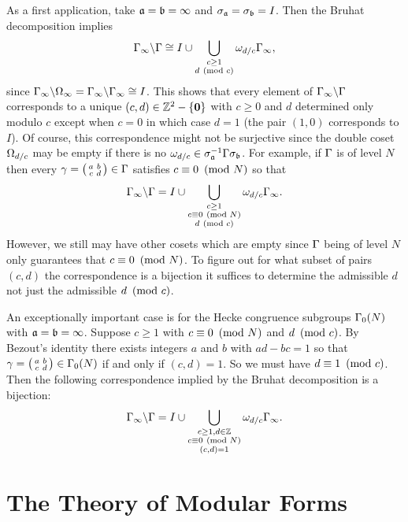       As a first application, take $\mathfrak{a} = \mathfrak{b} = \infty$ and $\sigma_{\mathfrak{a}} = \sigma_{\mathfrak{b}} = I$. Then the Bruhat decomposition implies
      \[
        \Gamma_{\infty}\backslash\Gamma \cong I\cup\bigcup_{\substack{c \ge 1 \\ d \ \left(\text{mod }c\right)}}\omega_{d/c}\Gamma_{\infty},
      \]
      since $\Gamma_{\infty}\backslash\Omega_{\infty} = \Gamma_{\infty}\backslash\Gamma_{\infty} \cong I$. This shows that every element of $\Gamma_{\infty}\backslash\Gamma$ corresponds to a unique $(c,d) \in \mathbb{Z}^{2}-\{\mathbf{0}\}$ with $c \ge 0$ and $d$ determined only modulo $c$ except when $c = 0$ in which case $d = 1$ (the pair $(1,0)$ corresponds to $I$). Of course, this correspondence might not be surjective since the double coset $\Omega_{d/c}$ may be empty if there is no $\omega_{d/c} \in \sigma_{\mathfrak{a}}^{-1}\Gamma\sigma_{\mathfrak{b}}$. For example, if $\Gamma$ is of level $N$ then every $\gamma = \begin{psmallmatrix} a & b \\ c & d \end{psmallmatrix} \in \Gamma$ satisfies $c \equiv 0 \ \left(\text{mod }N\right)$ so that
      \[
        \Gamma_{\infty}\backslash\Gamma = I\cup\bigcup_{\substack{c \ge 1 \\ c \equiv 0 \ \left(\text{mod }N\right) \\ d \ \left(\text{mod }c\right)}}\omega_{d/c}\Gamma_{\infty}.
      \]
      However, we still may have other cosets which are empty since $\Gamma$ being of level $N$ only guarantees that $c \equiv 0 \ \left(\text{mod }N\right)$. To figure out for what subset of pairs $(c,d)$ the correspondence is a bijection it suffices to determine the admissible $d$ not just the admissible $d \ \left(\text{mod }c\right)$. 
      
      \begin{remark}\label{rem:Bruhat_bijection}
        An exceptionally important case is for the Hecke congruence subgroups $\Gamma_{0}(N)$ with $\mathfrak{a} = \mathfrak{b} = \infty$. Suppose $c \ge 1$ with $c \equiv 0 \ \left(\text{mod }N\right)$ and $d \ \left(\text{mod }c\right)$. By Bezout's identity there exists integers $a$ and $b$ with $ad-bc = 1$ so that $\gamma = \begin{psmallmatrix} a & b \\ c & d \end{psmallmatrix} \in \Gamma_{0}(N)$ if and only if $(c,d) = 1$. So we must have $d \equiv 1 \ \left(\text{mod }c\right)$. Then the following correspondence implied by the Bruhat decomposition is a bijection:
        \[
          \Gamma_{\infty}\backslash\Gamma = I\cup\bigcup_{\substack{c \ge 1, d \in \mathbb{Z} \\ c \equiv 0 \ \left(\text{mod }N\right) \\ (c,d) = 1}}\omega_{d/c}\Gamma_{\infty}.
        \]
      \end{remark}
  \section{The Theory of Modular Forms}\label{sec:The_Theory_of_Modular_Forms}

